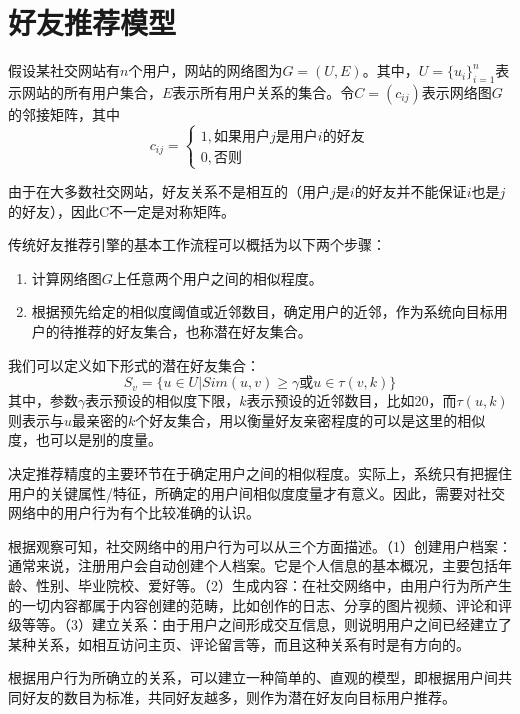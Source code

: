 \section{好友推荐模型}
假设某社交网站有$n$个用户，网站的网络图为$G=(U,E)$。其中，$U=\{u_i\}_{i=1}^{n}$表示网站的所有用户集合，$E$表示所有用户关系的集合。令$C=(c_{ij})$表示网络图$G$的邻接矩阵，其中
\[
    c_{ij}=\left\{
        \begin{array}{l}
        1, \text{如果用户$j$是用户$i$的好友}\\
        0, \text{否则}
        \end{array}
    \right.
\]

由于在大多数社交网站，好友关系不是相互的（用户$j$是$i$的好友并不能保证$i$也是$j$的好友），因此C不一定是对称矩阵。

传统好友推荐引擎的基本工作流程可以概括为以下两个步骤：
\begin{enumerate}[（1）]
\item 计算网络图$G$上任意两个用户之间的相似程度。
\item 根据预先给定的相似度阈值或近邻数目，确定用户的近邻，作为系统向目标用户的待推荐的好友集合，也称潜在好友集合。
\end{enumerate}

我们可以定义如下形式的潜在好友集合：
\begin{equation}\label{eq:friendrecsy}
S_v=\{u\in U|Sim(u,v) \ge \gamma \text{或} u \in \tau(v,k)\}
\end{equation}
其中，参数$\gamma$表示预设的相似度下限，$k$表示预设的近邻数目，比如20，而$\tau(u,k)$则表示与$u$最亲密的$k$个好友集合，用以衡量好友亲密程度的可以是这里的相似度，也可以是别的度量。

决定推荐精度的主要环节在于确定用户之间的相似程度。实际上，系统只有把握住用户的关键属性/特征，所确定的用户间相似度度量才有意义。因此，需要对社交网络中的用户行为有个比较准确的认识。

根据观察可知，社交网络中的用户行为可以从三个方面描述。（1）创建用户档案：通常来说，注册用户会自动创建个人档案。它是个人信息的基本概况，主要包括年龄、性别、毕业院校、爱好等。（2）生成内容：在社交网络中，由用户行为所产生的一切内容都属于内容创建的范畴，比如创作的日志、分享的图片视频、评论和评级等等。（3）建立关系：由于用户之间形成交互信息，则说明用户之间已经建立了某种关系，如相互访问主页、评论留言等，而且这种关系有时是有方向的。

根据用户行为所确立的关系，可以建立一种简单的、直观的模型，即根据用户间共同好友的数目为标准，共同好友越多，则作为潜在好友向目标用户推荐。

